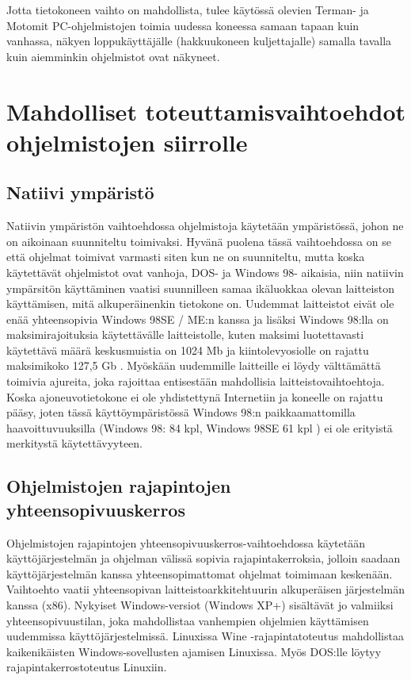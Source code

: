 \documentclass[11pt,a4paper,oneside,article]{memoir}
\begin{document}
Jotta tietokoneen vaihto on mahdollista, tulee käytössä olevien Terman- ja Motomit PC-ohjelmistojen toimia uudessa koneessa samaan tapaan kuin vanhassa, näkyen loppukäyttäjälle (hakkuukoneen kuljettajalle) samalla tavalla kuin aiemminkin ohjelmistot ovat näkyneet.

\section{Mahdolliset toteuttamisvaihtoehdot ohjelmistojen siirrolle}

\subsection{Natiivi ympäristö}

Natiivin ympäristön vaihtoehdossa ohjelmistoja käytetään ympäristössä, johon ne on aikoinaan suunniteltu toimivaksi. Hyvänä puolena tässä vaihtoehdossa on se että ohjelmat toimivat varmasti siten kun ne on suunniteltu, mutta koska käytettävät ohjelmistot ovat vanhoja, DOS- ja Windows 98- aikaisia, niin natiivin ympärsitön käyttäminen vaatisi suunnilleen samaa ikäluokkaa olevan laitteiston käyttämisen, mitä alkuperäinenkin tietokone on. Uudemmat laitteistot eivät ole enää yhteensopivia Windows 98SE / ME:n kanssa ja lisäksi Windows 98:lla on maksimirajoituksia käytettävälle laitteistolle, kuten maksimi luotettavasti käytettävä määrä keskusmuistia on 1024 Mb ja kiintolevyosiolle on rajattu maksimikoko 127,5 Gb \cite{win98:maxspecs}. Myöskään uudemmille laitteille ei löydy välttämättä toimivia ajureita, joka rajoittaa entisestään mahdollisia laitteistovaihtoehtoja. Koska ajoneuvotietokone ei ole yhdistettynä Internetiin ja koneelle on rajattu pääsy, joten tässä käyttöympäristössä Windows 98:n paikkaamattomilla haavoittuvuuksilla (Windows 98: 84 kpl, Windows 98SE 61 kpl \cite{win98:vulns}) ei ole erityistä merkitystä käytettävyyteen.

\subsection{Ohjelmistojen rajapintojen
yhteensopivuuskerros}

Ohjelmistojen rajapintojen yhteensopivuuskerros-vaihtoehdossa  käytetään käyttöjärjestelmän ja ohjelman välissä sopivia rajapintakerroksia, jolloin saadaan käyttöjärjestelmän kanssa yhteensopimattomat ohjelmat toimimaan keskenään. Vaihtoehto vaatii yhteensopivan laitteistoarkkitehtuurin alkuperäisen järjestelmän kanssa (x86). Nykyiset Windows-versiot (Windows XP+) sisältävät jo valmiiksi yhteensopivuustilan, joka mahdollistaa vanhempien ohjelmien käyttämisen uudemmissa käyttöjärjestelmissä. Linuxissa Wine -rajapintatoteutus mahdollistaa kaikenikäisten Windows-sovellusten ajamisen Linuxissa. Myös DOS:lle löytyy rajapintakerrostoteutus Linuxiin.
\end{document}
